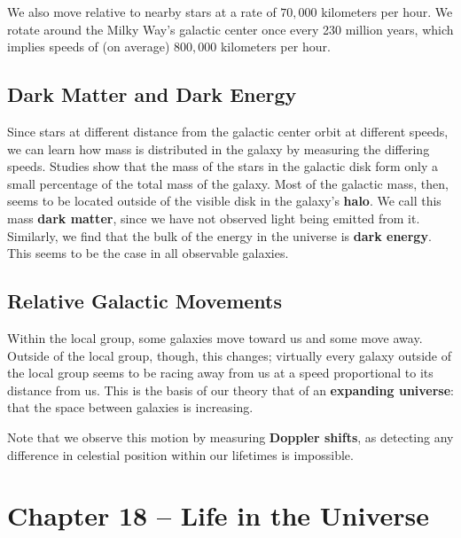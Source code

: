\documentclass[12pt]{article}
\begin{document}
We also move relative to nearby stars at a rate of $70,000$ kilometers per hour. We rotate around the Milky Way's galactic center once every 230 million years, which implies speeds of (on average) $800,000$ kilometers per hour.

\subsection{Dark Matter and Dark Energy}
Since stars at different distance from the galactic center orbit at different speeds, we can learn how mass is distributed in the galaxy by measuring the differing speeds. Studies show that the mass of the stars in the galactic disk form only a small percentage of the total mass of the galaxy. Most of the galactic mass, then, seems to be located outside of the visible disk in the galaxy's {\bf halo}. We call this mass {\bf dark matter}, since we have not observed light being emitted from it. Similarly, we find that the bulk of the energy in the universe is {\bf dark energy}. This seems to be the case in all observable galaxies.

\subsection{Relative Galactic Movements}
Within the local group, some galaxies move toward us and some move away. Outside of the local group, though, this changes; virtually every galaxy outside of the local group seems to be racing away from us at a speed proportional to its distance from us. This is the basis of our theory that of an {\bf expanding universe}: that the space between galaxies is increasing.

Note that we observe this motion by measuring {\bf Doppler shifts}, as detecting any difference in celestial position within our lifetimes is impossible.



\section{Chapter 18 -- Life in the Universe}
\end{document}
